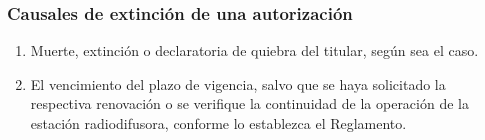 \documentclass[a4paper]{IEEEtran} %
\begin{document}
\subsubsection{Causales de extinción de una autorización}
\begin{enumerate}
	\item Muerte,  extinción  o  declaratoria  de  quiebra 
	del titular, según sea el caso.
	\item El  vencimiento  del  plazo  de  vigencia,  salvo 
	que se haya solicitado la respectiva renovación o 
	se verifique la continuidad  de la operación de la 
	estación radiodifusora, conforme lo establezca el 
	Reglamento. 
\end{enumerate}
\end{document}

